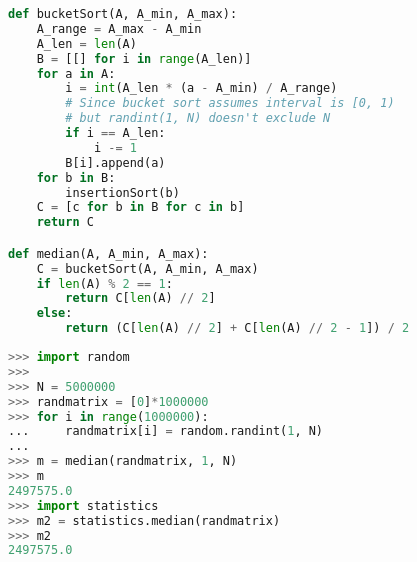 \documentclass[12pt]{article}
\newenvironment{problem}[2][Problem]{\begin{trivlist}
\item[\hskip \labelsep {\bfseries #1}\hskip \labelsep {\bfseries #2.}]}{\end{trivlist}}
\begin{document}
\begin{problem}{1}
\begin{lstlisting}[language=Python, caption=Find Median of a Random Array]
def bucketSort(A, A_min, A_max):
    A_range = A_max - A_min
    A_len = len(A)
    B = [[] for i in range(A_len)]
    for a in A:
        i = int(A_len * (a - A_min) / A_range)
        # Since bucket sort assumes interval is [0, 1)
        # but randint(1, N) doesn't exclude N
        if i == A_len:
            i -= 1
        B[i].append(a)
    for b in B:
        insertionSort(b)
    C = [c for b in B for c in b]
    return C

def median(A, A_min, A_max):
    C = bucketSort(A, A_min, A_max)
    if len(A) % 2 == 1:
        return C[len(A) // 2]
    else:
        return (C[len(A) // 2] + C[len(A) // 2 - 1]) / 2
\end{lstlisting}

\begin{lstlisting}[language=Python, caption=Sample execution of function in terminal]
>>> import random
>>> 
>>> N = 5000000
>>> randmatrix = [0]*1000000
>>> for i in range(1000000):
...     randmatrix[i] = random.randint(1, N)
...
>>> m = median(randmatrix, 1, N)
>>> m
2497575.0
>>> import statistics
>>> m2 = statistics.median(randmatrix)
>>> m2
2497575.0
\end{lstlisting}

\end{problem}

 
\end{document}
